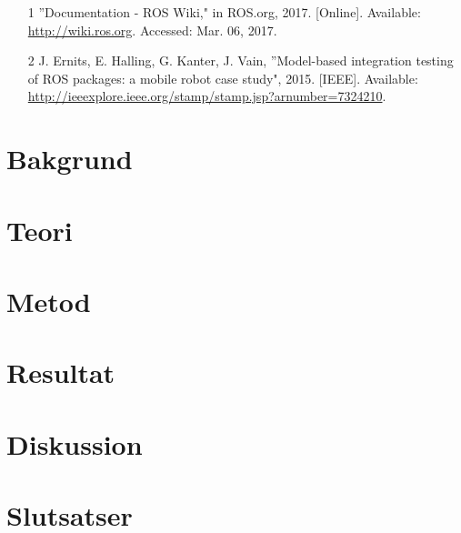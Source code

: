 \begin{itemize}
	\item [1] \textquotedblright Documentation - ROS Wiki," in ROS.org, 2017. [Online]. Available: \url{http://wiki.ros.org}. Accessed: Mar. 06, 2017.
	\item [2] J. Ernits, E. Halling, G. Kanter, J. Vain, \textquotedblright Model-based integration testing of ROS packages:
	a mobile robot case study", 2015. [IEEE]. Available: \url{http://ieeexplore.ieee.org/stamp/stamp.jsp?arnumber=7324210}.	
\end{itemize}

\section{Bakgrund}
\label{sec:background-person}


\section{Teori}
\label{sec:theory-person}


\section{Metod}
\label{sec:method-person}


\section{Resultat}
\label{sec:results-person}


\section{Diskussion}
\label{sec:discussion-person}


\section{Slutsatser}
\label{sec:conclusions-person}


